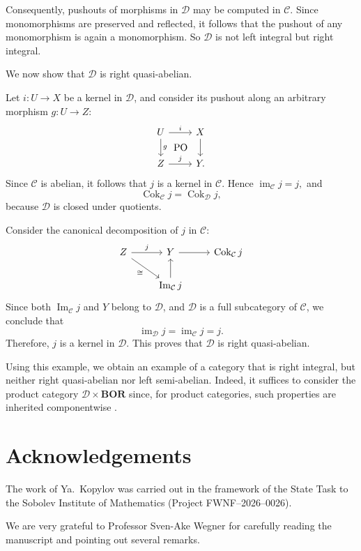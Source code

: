 \documentclass[a4paper,10pt,reqno]{amsart}
\newcommand{\Coker}{\operatorname{Cok}\nolimits}
\renewcommand{\Im}{\operatorname{Im}\nolimits}
\newcommand{\im}{\operatorname{im}\nolimits}
\begin{document}
	Consequently, pushouts of morphisms in $\mathcal D$ may be computed in $\mathcal C$. Since monomorphisms are preserved and reflected, it follows that the pushout of any monomorphism is again a monomorphism. So $\mathcal{D}$ is not left integral but right integral.
	
	We now show that $\mathcal{D}$ is right quasi-abelian.
	
	Let $i\colon U\to X$ be a kernel in $\mathcal{D}$, and consider its pushout along an arbitrary morphism $g\colon U\to Z:$
	$$
	\begin{tikzcd}
		U \arrow[r, "i"] \arrow[d, "g"] \arrow[r, "\mathrm{PO}", phantom, bend right=60] & X \arrow[d] \\
		Z \arrow[r, "j"] & Y.
	\end{tikzcd}
	$$
	Since $\mathcal{C}$ is abelian, it follows that $j$ is a kernel in $\mathcal{C}$. Hence $\im_{\mathcal{C}} j = j,$ and
	$$
	\Coker_{\mathcal{C}} j=\Coker_{\mathcal{D}} j,
	$$
	because $\mathcal{D}$ is closed under quotients.
	
	Consider the canonical decomposition of $j$ in $\mathcal{C}$:
	$$
	\begin{tikzcd}
		Z \arrow[r, "j"] \arrow[rd, "\cong"'] & Y \arrow[r] & \Coker_{\mathcal{C}}j \\
		& \Im_{\mathcal{C}}j \arrow[u] &
	\end{tikzcd}
	$$
	Since both $\Im_{\mathcal{C}} j$ and $Y$ belong to $\mathcal{D}$, and $\mathcal{D}$ is a full subcategory of $\mathcal{C}$, we conclude that
	$$
	\im_{\mathcal{D}} j=\im_{\mathcal{C}} j=j.
	$$
	Therefore, $j$ is a kernel in $\mathcal{D}$. This proves that $\mathcal{D}$ is right quasi-abelian.
	
	Using this example, we obtain an example of a category that is right integral, but neither right quasi-abelian nor left semi-abelian. Indeed, it suffices to consider the product category $\mathcal{D}\times \mathbf{BOR}$ since, for product categories, such properties are inherited componentwise \cite[Theorem 3.8]{HSW2021}.
	
	
	\section*{Acknowledgements}
	The work of Ya.~Kopylov was carried out in the framework of the State Task to the
	Sobolev Institute of Mathematics (Project FWNF--2026--0026). 
	
	We are very grateful to
	Professor Sven-Ake Wegner for carefully reading the manuscript and
	pointing out several remarks.
	
\end{document}
